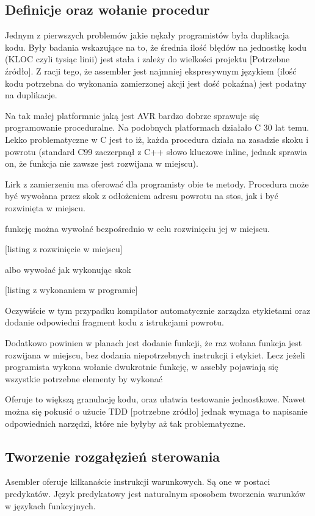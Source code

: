 \documentclass[11pt]{article}
\begin{document}
\subsection{Definicje oraz wołanie procedur}

Jednym z pierwszych problemów jakie nękały programistów była duplikacja kodu. Były badania wskazujące na to, że  średnia ilość błędów na jednostkę kodu (KLOC czyli tysiąc linii) jest stała i zależy do wielkości projektu [Potrzebne źródło]. Z racji tego, że assembler jest najmniej ekspresywnym językiem (ilość kodu potrzebna do wykonania zamierzonej akcji jest dość pokaźna) jest podatny na duplikacje. 

Na tak małej platformnie jaką jest AVR bardzo dobrze sprawuje się programowanie proceduralne. Na podobnych platformach działało C 30 lat temu. Lekko problematyczne w C jest to iż, każda procedura działa na zasadzie skoku i powrotu (standard C99 zaczerpnął z C++ słowo kluczowe inline, jednak sprawia on, że funkcja nie zawsze jest rozwijana w miejscu). 

Lirk z zamierzeniu ma oferować dla programisty obie te metody. Procedura może być wywołana przez skok z odłożeniem adresu powrotu na stos, jak i być rozwinięta w miejscu.

funkcję można wywołać bezpośrednio w celu rozwinięciu jej w miejscu.

[listing z rozwinięcie w miejscu]

albo wywołać jak wykonując skok

[listing z wykonaniem w programie]

Oczywiście w tym przypadku kompilator automatycznie zarządza etykietami oraz dodanie odpowiedni fragment kodu z istrukcjami powrotu.

Dodatkowo powinien w planach jest dodanie funkcji, że raz wołana funkcja jest rozwijana w miejscu, bez dodania niepotrzebnych instrukcji i etykiet. Lecz jeżeli programista wykona wołanie dwukrotnie funkcję, w assebly pojawiają się wszystkie potrzebne elementy by wykonać  

Oferuje to większą granulację kodu, oraz ułatwia testowanie jednostkowe. Nawet można się pokusić o użucie TDD [potrzebne zródło] jednak wymaga to napisanie odpowiednich narzędzi, które nie byłyby aż tak problematyczne.

\subsection{Tworzenie rozgałęzień sterowania}
Asembler oferuje kilkanaście instrukcji warunkowych. Są one w postaci predykatów. Język predykatowy jest naturalnym sposobem tworzenia warunków w językach funkcyjnych. 
\end{document}
